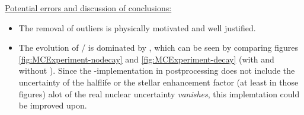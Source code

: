 \underline{Potential errors and discussion of conclusions:}
\begin{itemize}
\item The removal of outliers is physically motivated and well justified.
\item The evolution of / is dominated by \betadecay, which can be seen by comparing figures \ref{fig:MCExperiment-nodecay} and \ref{fig:MCExperiment-decay} (with and without \betadecay). Since the \betadecay-implementation in postprocessing does not include the uncertainty of the  halflife or the stellar enhancement factor (at least in those figures) alot of the real nuclear uncertainty \textit{vanishes}, this implemtation could be improved upon.
\end{itemize}

